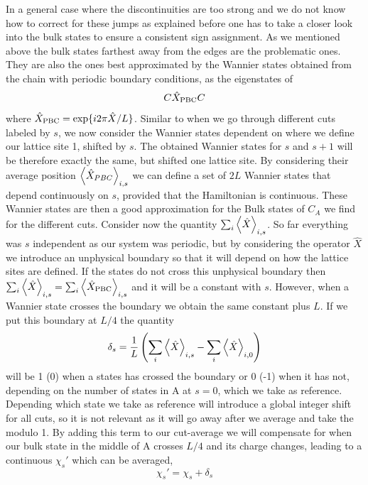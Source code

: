 \documentclass[twocolumn,amsmath,longbibliography,amssymb,superscriptaddress]{revtex4-1}
\begin{document}
In a general case where the discontinuities are too strong and we do not know how to correct for these jumps as explained before one has to take a closer look into the bulk states to ensure a consistent sign assignment. As we mentioned above the bulk states farthest away from the edges are the problematic ones. They are also the ones best approximated by the Wannier states obtained from the chain with periodic boundary conditions, as the eigenstates of 
\begin{equation}
C\hat{X}_{\rm PBC}C
\end{equation}
where $\hat{X}_{\rm PBC} = \exp\{i 2\pi \hat{X}/L\}$. Similar to when we go through different cuts labeled by $s$, we now consider the Wannier states dependent on where we define our lattice site 1, shifted by $s$. The obtained Wannier states for $s$ and $s+1$ will be therefore exactly the same, but shifted one lattice site. By considering their average position $\expval{\hat{X}_{PBC}}_{i,s}$ we can define a set of $2L$ Wannier states that depend continuously on $s$, provided that the Hamiltonian is continuous. These Wannier states are then a good approximation for the Bulk states of $C_A$ we find for the different cuts. 
Consider now the quantity $\sum_i\expval{\hat{X}}_{i,s}$. So far everything was $s$ independent as our system was periodic, but by considering the operator $\hat{X}$ we introduce an unphysical boundary so that it will depend on how the lattice sites are defined. If the states do not cross this unphysical boundary then $\sum_i\expval{\hat{X}}_{i,s} = \sum_i\expval{\hat{X}_{\rm PBC}}_{i,s} $ and it will be a constant with $s$. However, when a Wannier state crosses the boundary we obtain the same constant plus $L$. If we put this boundary at $L/4$ the quantity 
\begin{equation}
\delta_s = \frac{1}{L}\left(\sum_i\expval{\hat{X}}_{i,s}-\sum_i\expval{\hat{X}}_{i,0}\right)
\end{equation}
will be 1 (0) when a states has crossed the boundary or 0 (-1) when it has not, depending on the number of states in A at $s=0$, which we take as reference. Depending which state we take as reference will introduce a global integer shift for all cuts, so it is not relevant as it will go away after we average and take the modulo 1. By adding this term to our cut-average we will compensate for when our bulk state in the middle of A crosses $L/4$ and its charge changes, leading to a continuous $\chi_s'$ which can be averaged,
\begin{equation}
\chi_s' = \chi_s + \delta_s
\end{equation} 
\end{document}
